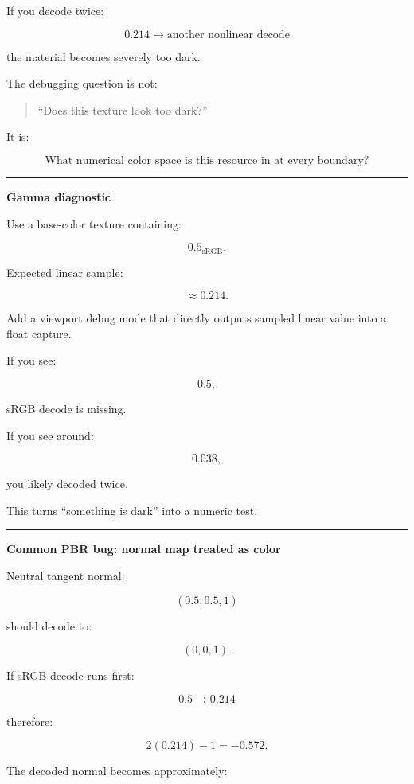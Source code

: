 If you decode twice:

\[
0.214
\rightarrow
\text{another nonlinear decode}
\]

the material becomes severely too dark.

The debugging question is not:

\begin{quote}
``Does this texture look too dark?''
\end{quote}

It is:

\[
\boxed{
\text{What numerical color space is this resource in at every boundary?}
}
\]

\begin{center}\rule{0.5\linewidth}{0.5pt}\end{center}

\textbf{Gamma diagnostic}

Use a base-color texture containing:

\[
0.5_{\text{sRGB}}.
\]

Expected linear sample:

\[
\approx0.214.
\]

Add a viewport debug mode that directly outputs sampled linear value into a float capture.

If you see:

\[
0.5,
\]

sRGB decode is missing.

If you see around:

\[
0.038,
\]

you likely decoded twice.

This turns ``something is dark'' into a numeric test.

\begin{center}\rule{0.5\linewidth}{0.5pt}\end{center}

\textbf{Common PBR bug: normal map treated as color}

Neutral tangent normal:

\[
(0.5,0.5,1)
\]

should decode to:

\[
(0,0,1).
\]

If sRGB decode runs first:

\[
0.5\rightarrow0.214
\]

therefore:

\[
2(0.214)-1=-0.572.
\]

The decoded normal becomes approximately:

